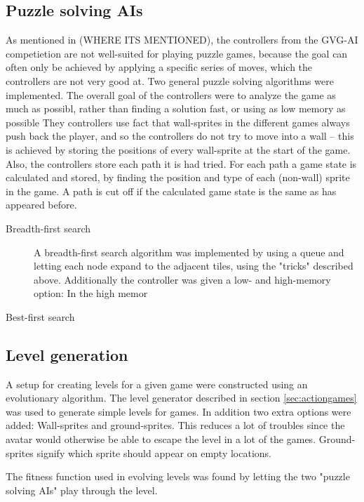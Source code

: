 \documentclass[a4paper,titlepage,final]{report}
\begin{document}
\subsection{Puzzle solving AIs} 
As mentioned in (WHERE ITS MENTIONED), the controllers from the GVG-AI competietion are not well-suited for playing puzzle games, because the goal can often only be achieved by applying a specific series of moves, which the controllers are not very good at.
Two general puzzle solving algorithms were implemented. The overall goal of the controllers were to analyze the game as much as possibl, rather than finding a solution fast, or using as low memory as possible
They controllers use fact that wall-sprites in the different games always push back the player, and so the controllers do not try to move into a wall -- this is achieved by storing the positions of every wall-sprite at the start of the game. 
Also, the controllers store each path it is had tried. For each path a game state is calculated and stored, by finding the position and type of each (non-wall) sprite in the game. A path is cut off if the calculated game state is the same as has appeared before.

\begin{description}
\item[Breadth-first search]
A breadth-first search algorithm was implemented by using a queue and letting each node expand to the adjacent tiles, using the "tricks" described above. 
Additionally the controller was given a low- and high-memory option: In the high memor

\item[Best-first search]
\end{description}


\subsection{Level generation} 
A setup for creating levels for a given game were constructed using an evolutionary algorithm. The level generator described in section \ref{sec:actiongames} was used to generate simple levels for games.  In addition two extra options were added: Wall-sprites and ground-sprites. This reduces a lot of troubles since the avatar would otherwise be able to escape the level in a lot of the games. Ground-sprites signify which sprite should appear on empty locations.

The fitness function used in evolving levels was found by letting the two "puzzle solving AIs" play through the level. 
\end{document}
